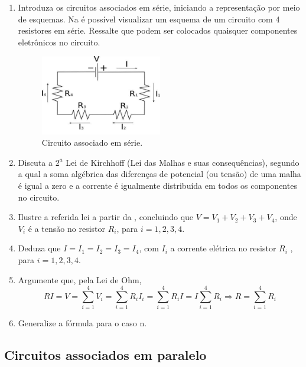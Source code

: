 \documentclass{textolivre-html}
\begin{document}
\begin{enumerate}
\item Introduza os circuitos associados em série, iniciando a representação por
meio de esquemas. Na  é possível visualizar um esquema de um
circuito com 4 resistores em série. Ressalte que podem ser colocados quaisquer
componentes eletrônicos no circuito.

\begin{figure}[H]
\centering
\includegraphics[width=0.5\textwidth]{figure-29.pdf}
\caption{Circuito associado em série.}
\label{fig19}
\end{figure}

\item Discuta a $2^a$ Lei de Kirchhoff (Lei das Malhas e suas consequências),
segundo a qual a soma algébrica das diferenças de potencial (ou tensão) de uma
malha é igual a zero e a corrente é igualmente distribuída em todos os
componentes no circuito.

\item Ilustre a referida lei a partir da , concluindo que $V=V_1 +
V_2 + V_3 + V_4$, onde $V_i$ é a tensão no resistor $R_i$, para $i=1,2,3,4$.

\item Deduza que $I = I_1 = I_2 = I_3 = I_4$, com $I_i$ a corrente elétrica no
resistor $R_i$ , para $i=1,2,3,4$.

\item Argumente que, pela Lei de Ohm,
\begin{equation*}
RI = V = \sum_{i=1}^{4} V_i = \sum_{i=1}^{4} R_i I_i = \sum_{i=1}^{4} R_i I = I \sum_{i=1}^{4} R_i \Rightarrow R = \sum_{i=1}^{4} R_i
\end{equation*}

\item Generalize a fórmula para o caso n.

\end{enumerate}



\subsection{Circuitos associados em paralelo}\label{sec-circ-ass-p}
\end{document}
